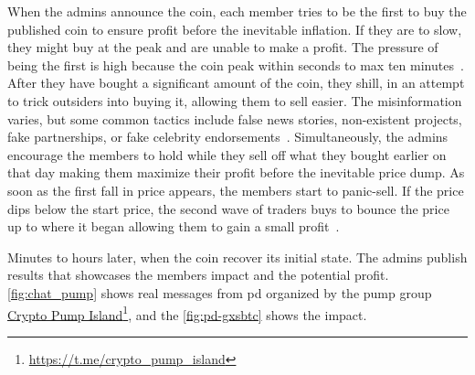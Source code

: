 When the admins announce the coin, each member tries to be the first to buy the published coin to ensure profit before the inevitable inflation. If they are to slow, they might buy at the peak and are unable to make a profit. The pressure of being the first is high because the coin peak within seconds to max ten minutes~\cite{P&D_the_outline}. After they have bought a significant amount of the coin, they shill, in an attempt to trick outsiders into buying it, allowing them to sell easier. The misinformation varies, but some common tactics include false news stories, non-existent projects, fake partnerships, or fake celebrity endorsements~\cite{P&D_the_outline}. Simultaneously, the admins encourage the members to hold while they sell off what they bought earlier on that day making them maximize their profit before the inevitable price dump. As soon as the first fall in price appears, the members start to panic-sell. If the price dips below the start price, the second wave of traders buys to bounce the price up to where it began allowing them to gain a small profit~\cite{P&D_anatomy}.

Minutes to hours later, when the coin recover its initial state. The admins publish results that showcases the members impact and the potential profit. \autoref{fig:chat_pump} shows real messages from \ac{pd} organized by the pump group \href{https://t.me/crypto_pump_island}{Crypto Pump Island}\footnote{\url{https://t.me/crypto_pump_island}}, and the \autoref{fig:pd-gxsbtc} shows the impact.


